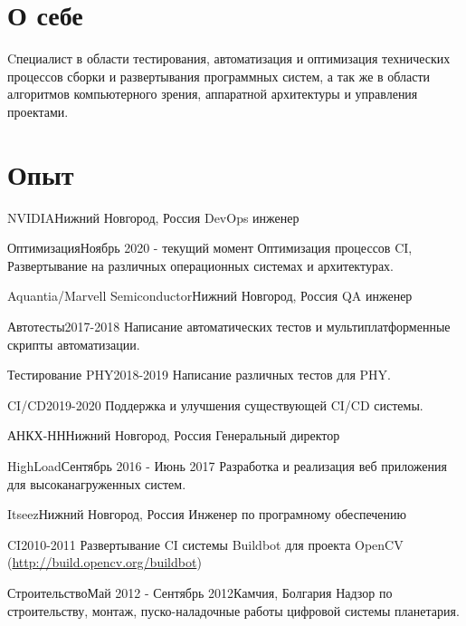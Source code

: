 \documentclass[12pt,a4paper]{moderncv}
\begin{document}
\maketitle

\section{О себе}
Cпециалист в области тестирования, автоматизация и оптимизация технических процессов сборки и развертывания программных систем,
а так же в области алгоритмов компьютерного зрения, аппаратной архитектуры и управления проектами.

\section{Опыт}
	{NVIDIA}{Нижний Новгород, Россия}{}{}
	{DevOps инженер}

\cventry{}
	{Оптимизация}{Ноябрь 2020 - текущий момент}{}{}
	{Оптимизация процессов CI, Развертывание на различных операционных системах и архитектурах.}

	{Aquantia/Marvell Semiconductor}{Нижний Новгород, Россия}{}{}
	{QA инженер}

\cventry{}
	{Автотесты}{2017-2018}{}{}
	{Написание автоматических тестов и мультиплатформенные скрипты автоматизации.}

\cventry{}
	{Тестирование PHY}{2018-2019}{}{}
	{Написание различных тестов для PHY.}

\cventry{}
	{CI/CD}{2019-2020}{}{}
	{Поддержка и улучшения существующей CI/CD системы.}

	{АНКХ-НН}{Нижний Новгород, Россия}{}{}
	{Генеральный директор}

\cventry{}
	{HighLoad}{Сентябрь 2016 - Июнь 2017}{}{}
	{Разработка и реализация веб приложения для высоканагруженных систем.}

	{Itseez}{Нижний Новгород, Россия}{}{}
	{Инженер по програмному обеспечению}

\cventry{}
	{CI}{2010-2011}{}{}
	{Развертывание CI системы Buildbot для проекта OpenCV \newline (\url{http://build.opencv.org/buildbot})}

\cventry{}
	{Строительство}{Май 2012 - Сентябрь 2012}{Камчия, Болгария}{}
	{Надзор по строительству, монтаж, пуско-наладочные работы цифровой системы планетария.}
\end{document}
